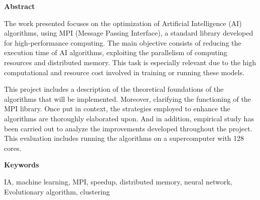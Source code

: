 
\newpage

\thispagestyle{empty}

\begin{center}

{\bf \Huge Abstract}

  \end{center}
\vspace{1cm}

The work presented focuses on the optimization of Artificial Intelligence (AI) algorithms, using MPI (Message Passing Interface), a standard library developed for high-performance computing.
The main objective consists of reducing the execution time of AI algorithms, exploiting the parallelism of computing resources and distributed memory. This task is especially relevant due to the high computational and resource cost involved in training or running these models.

This project includes a description of the theoretical foundations of the algorithms that will be implemented. Moreover, clarifying the functioning of the MPI library.
Once put in context, the strategies employed to enhance the algorithms are thoroughly elaborated upon.
And in addition, empirical study has been carried out to analyze the improvements developed throughout the project. This evaluation includes running the algorithms on a supercomputer with 128 cores.


\vspace{1cm}


\begin{center}

{\bf \Large Keywords}

   \end{center}

   \vspace{0.5cm}
   
IA, machine learning, MPI, speedup, distributed memory, neural network, Evolutionary algorithm, clustering
   


